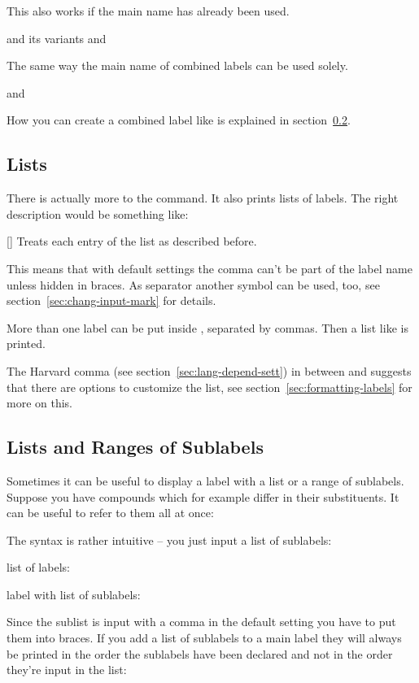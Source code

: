 \documentclass[load-preamble+,babel-options={ngerman,british,american}]{cnltx-doc}
\begin{document}
This also works if the main name has already been used.
\begin{example}
   and its variants  and 
\end{example}

The same way the main name of combined labels can be used solely.
\begin{example}
   and 
\end{example}

How you can create a combined label like  is explained in
section~\ref{sec:lists-rang-subl}.

\subsection{Lists}\label{sec:lists}
There is actually more to the  command.  It also prints lists of
labels.  The right description would be something like:
\begin{commands}
  []
    Treats each entry of the list as described before.
\end{commands}
This means that with default settings the comma can't be part of the label
name unless hidden in braces.  As separator another symbol can be used, too,
see section~\ref{sec:chang-input-mark} for details.

\begin{example}
  More than one label can be put inside , separated by commas.  Then
  a list like  is printed.
\end{example}
The Harvard comma (see section~\ref{sec:lang-depend-sett}) in 
between  and  suggests that there are options to customize
the list, see section~\ref{sec:formatting-labels} for more on this.

\subsection{Lists and Ranges of Sublabels}\label{sec:lists-rang-subl}
Sometimes it can be useful to display a label with a list or a range of
sublabels.  Suppose you have compounds
 which for example differ in their
substituents.  It can be useful to refer to them all at once:

The syntax is rather intuitive -- you just input a list of sublabels:
\begin{example}
  list of labels: \par
  label with list of sublabels: 
\end{example}
Since the sublist is input with a comma in the default setting you have to
put them into braces.  If you add a list of sublabels to a main label they
will always be printed in the order the sublabels have been declared and not
in the order they're input in the list:
\end{document}
